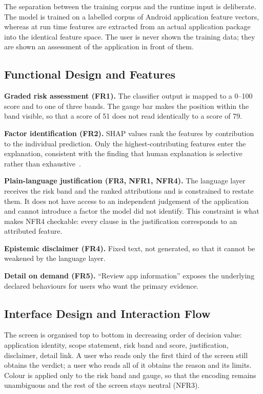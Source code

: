 \documentclass[sigconf]{acmart}
\begin{document}
The separation between the training corpus and the runtime input is
deliberate. The model is trained on a labelled corpus of Android
application feature vectors, whereas at run time features are extracted
from an actual application package into the identical feature space. The
user is never shown the training data; they are shown an assessment of the
application in front of them.

\subsection{Functional Design and Features}

\textbf{Graded risk assessment (FR1).} The classifier output is mapped to a
0--100 score and to one of three bands. The gauge bar makes the position
within the band visible, so that a score of 51 does not read identically to
a score of 79.

\textbf{Factor identification (FR2).} SHAP values rank the features by
contribution to the individual prediction. Only the highest-contributing
features enter the explanation, consistent with the finding that human
explanation is selective rather than exhaustive~\cite{miller2019explanation}.

\textbf{Plain-language justification (FR3, NFR1, NFR4).} The language layer
receives the risk band and the ranked attributions and is constrained to
restate them. It does not have access to an independent judgement of the
application and cannot introduce a factor the model did not identify. This
constraint is what makes NFR4 checkable: every clause in the justification
corresponds to an attributed feature.

\textbf{Epistemic disclaimer (FR4).} Fixed text, not generated, so that it
cannot be weakened by the language layer.

\textbf{Detail on demand (FR5).} ``Review app information'' exposes the
underlying declared behaviours for users who want the primary evidence.

\subsection{Interface Design and Interaction Flow}

The screen is organised top to bottom in decreasing order of decision
value: application identity, scope statement, risk band and score,
justification, disclaimer, detail link. A user who reads only the first
third of the screen still obtains the verdict; a user who reads all of it
obtains the reason and its limits. Colour is applied only to the risk band
and gauge, so that the encoding remains unambiguous and the rest of the
screen stays neutral (NFR3).
\end{document}
